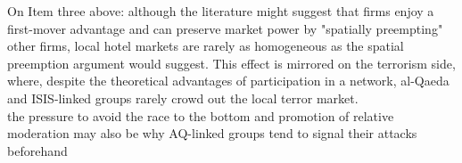 \documentclass{article}
\begin{document}
On Item three above: although the literature might suggest that firms enjoy a first-mover advantage and
can preserve market power by "spatially preempting" other firms, local
hotel markets are rarely as homogeneous as the spatial preemption
argument would suggest. This effect is mirrored on the terrorism side,
where, despite the theoretical advantages of participation in a
network, al-Qaeda and ISIS-linked groups rarely crowd out the local
terror market.\\

the pressure to avoid the race to the bottom and promotion of
  relative moderation may also be why AQ-linked groups tend to signal
  their attacks beforehand 




\end{document}
